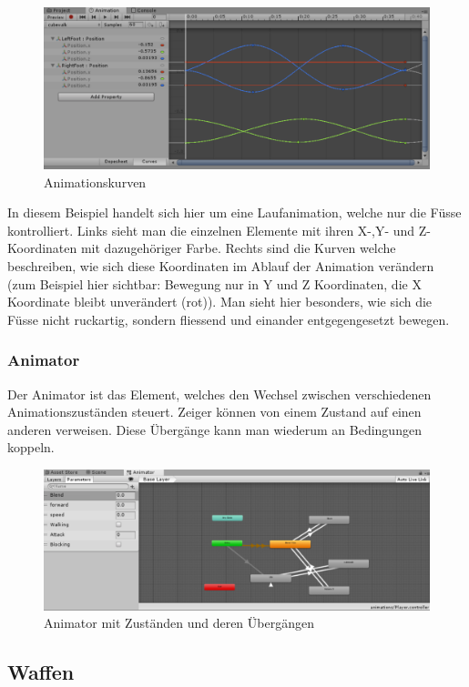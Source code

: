 \begin{figure}[H]
\includegraphics[scale=0.7]{screenshots/animations.png}
\caption{Animationskurven}
\end{figure}

In diesem Beispiel handelt sich hier um eine Laufanimation, welche nur die Füsse kontrolliert. Links sieht man die einzelnen Elemente mit ihren X-,Y- und Z-Koordinaten mit dazugehöriger Farbe. Rechts sind die Kurven welche beschreiben, wie sich diese Koordinaten im Ablauf der Animation verändern (zum Beispiel hier sichtbar: Bewegung nur in Y und Z Koordinaten, die X Koordinate bleibt unverändert (rot)).
Man sieht hier besonders, wie sich die Füsse nicht ruckartig, sondern fliessend und einander entgegengesetzt bewegen.

\subsubsection{Animator}
Der Animator ist das Element, welches den Wechsel zwischen verschiedenen Animationszuständen steuert. Zeiger können von einem Zustand auf einen anderen verweisen. Diese Übergänge kann man wiederum an Bedingungen koppeln.
\begin{figure}[H]
\includegraphics[scale=0.67]{screenshots/animator.png}
\caption{Animator mit Zuständen und deren Übergängen}
\end{figure}

\subsection{Waffen}
\label{subsec:weapons}

